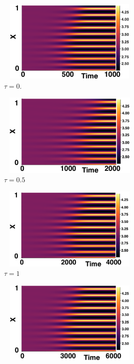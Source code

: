 \begin{figure}[H]
    \centering
    \begin{subfigure}[b]{0.45\textwidth}
        \centering
        \includegraphics[width=7cm,height=4cm]{p2t0.png}
        \caption{$\tau=0$.}
        \label{}
    \end{subfigure}
    \hfill
    \begin{subfigure}[b]{0.45\textwidth}
        \centering
        \includegraphics[width=7cm,height=4cm]{p2t05.png}
        \caption{$\tau=0.5$}
        \label{}
    \end{subfigure}
    \hfill
    \begin{subfigure}[b]{0.45\textwidth}
        \centering
        \includegraphics[width=7cm,height=4cm]{p2t1.png}
        \caption{$\tau=1$}
        \label{}
    \end{subfigure}
    \hfill
    \begin{subfigure}[b]{0.45\textwidth}
        \centering
        \includegraphics[width=7cm,height=4cm]{p2t15.png}

\end{subfigure}
\end{figure}

